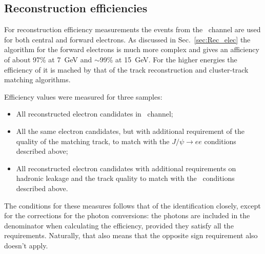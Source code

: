 \begin{figure}
\end{figure}


\subsection{Reconstruction efficiencies}

For reconstruction efficiency measurements the events from the \Zee\ channel are used for both central and forward electrons. As discussed in Sec.~\ref{sec:Rec_elec} the algorithm for the forward electrons is much more complex and gives an afficiency of about 97\% at 7~GeV and $\sim$99\% at 15~GeV. For the higher energies the efficiency of it is mached by that of the track reconstruction and cluster-track matching algorithms.

Efficiency values were measured for three samples:

\begin{itemize}
\item All reconstructed electron candidates in \Zee\ channel;
\item All the same electron candidates, but with additional requirement of the quality of the matching track, to match with the $J/\psi \to ee$ conditions described above;
\item All reconstructed electron candidates with additional requirements on hadronic leakage and the track quality to match with the \Wenu\ conditions described above.
\end{itemize}

The conditions for these measures follows that of the identification closely, except for the corrections for the photon conversions: the photons are included in the denominator when calculating the efficiency, provided they satisfy all the requirements. Naturally, that also means that the opposite sign requirement also doesn't apply.

